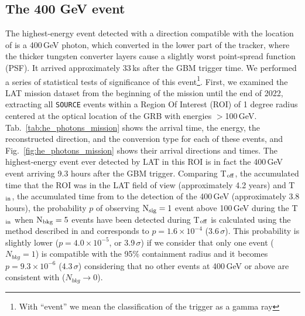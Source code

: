 \documentclass[preprint]{aastex631}
\begin{document}
\subsection{The 400 GeV event}
\label{sec:400GeV}
The highest-energy event detected with a direction compatible with the location of \grb is a 400\,GeV photon, which converted in the lower part of the tracker, where the thicker tungsten converter layers cause a slightly worst point-spread function (PSF). It arrived approximately 33\,ks after the GBM trigger time. 
We performed a series of statistical tests of significance of this event\footnote{With ``event'' we mean the classification of the trigger as a gamma ray}.  First, we examined the LAT mission dataset from the beginning of the mission until the end of 2022, extracting all \texttt{SOURCE} events within a Region Of Interest (ROI) of 1 degree radius centered at the optical location of the GRB with energies $>$100\,GeV. Tab.~\ref{tab:he_photons_mission} shows the arrival time, the energy, the reconstructed direction, and the conversion type for each of these events, and Fig.~\ref{fig:he_photons_mission} shows their arrival directions and times. The highest-energy event ever detected by LAT in this ROI is in fact the 400\,GeV event arriving 9.3 hours after the GBM trigger. 
Comparing T$_{\rm off}$, the accumulated time that the ROI was in the LAT field of view (approximately 4.2 years) and T$_{\rm in}$, the accumulated time from \trig to the detection of the 400\,GeV (approximately 3.8 hours), the probability $p$ of observing $\rm N_{sig}=1$ event above 100\,GeV during the T$_{\rm in}$ when $\rm N_{bkg}=5$ events have been detected during T$_{\rm off}$ is calculated using the method described in \citet{LiMa} and corresponds to $p=1.6\times10^{-4}$ (3.6\,$\sigma$). This probability is slightly lower ($p=4.0\times10^{-5}$, or 3.9\,$\sigma$) if we consider that only one event ($N_{bkg}=1$) is compatible with the 95\% containment radius and it becomes $p = 9.3 \times 10^{-6}$ (4.3\,$\sigma$) considering that no other events at 400\,GeV or above are consistent with \grb ($N_{bkg}\rightarrow 0$).
\end{document}
